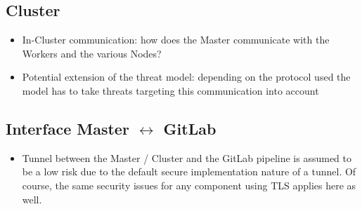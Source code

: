 \subsection{Cluster}
\begin{itemize}
    \item In-Cluster communication: how does the Master communicate with the Workers and the various Nodes?
    \item Potential extension of the threat model: depending on the protocol used the model has to take threats targeting this communication into account
\end{itemize}

\subsection{Interface Master \(\leftrightarrow\) GitLab}
\begin{itemize}
    \item Tunnel between the Master / Cluster and the GitLab pipeline is assumed to be a low risk due to the default secure implementation nature of a tunnel. Of course, the same security issues for any component using TLS applies here as well.
\end{itemize}

